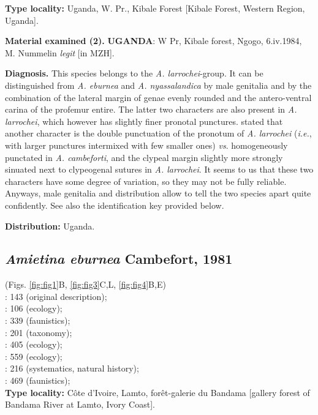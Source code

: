 \documentclass[fleqn,10pt,lineno]{wlpeerj}
\begin{document}
\textbf{Type locality:} Uganda, W. Pr., Kibale Forest [Kibale Forest, Western Region, Uganda].

\textbf{Material examined (2\male\male).} \textbf{UGANDA}: W Pr, Kibale forest, Ngogo, 6.iv.1984, M. Nummelin \textit{legit} [in MZH].

\textbf{Diagnosis.} This species belongs to the \textit{A. larrochei}-group. It can be distinguished from \textit{A. eburnea} and \textit{A. nyassalandica} by male genitalia and by the combination of the lateral margin of genae evenly rounded and the antero-ventral carina of the profemur entire. The latter two characters are also present in \textit{A. larrochei}, which however has slightly finer pronotal punctures. \cite{branco1989deux} stated that another character is the double punctuation of the pronotum of \textit{A. larrochei} (\textit{i.e.}, with larger punctures intermixed with few smaller ones) \textit{vs}. homogeneously punctated in \textit{A. cambeforti}, and the clypeal margin slightly more strongly sinuated next to clypeogenal sutures in \textit{A. larrochei}. It seems to us that these two characters have some degree of variation, so they may not be fully reliable. Anyways, male genitalia and distribution allow to tell the two species apart quite confidently. See also the identification key provided below.

\textbf{Distribution:} Uganda.



\subsection*{\textbf{\textit{Amietina eburnea} Cambefort, 1981}}
(Figs. \ref{fig:fig1}B, \ref{fig:fig3}C,L, \ref{fig:fig4}B,E) \\
\cite{cambefort1981amietina}: 143 (original description);\\
\cite{cambefort1984etude}: 106 (ecology);\\
\cite{cambefort1985coleopteres}: 339 (faunistics);\\
\cite{branco1989deux}: 201 (taxonomy);\\
\cite{cambefort1991dung}: 405 (ecology);\\
\cite{cambefort2003nimba}: 559 (ecology);\\
\cite{davis2008african}: 216 (systematics, natural history);\\
\cite{moretto2010bayanga}: 469 (faunistics);\\

\textbf{Type locality:} C\^ote d'Ivoire, Lamto, for\^et-galerie du Bandama [gallery forest of Bandama River at Lamto, Ivory Coast].
\end{document}
